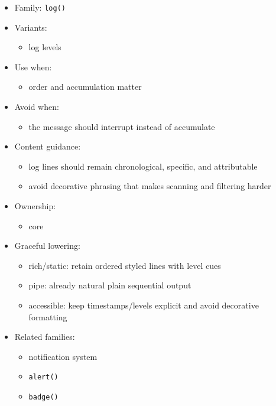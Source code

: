 \begin{itemize}
\tightlist
\item
  Family: \texttt{l\allowbreak{}o\allowbreak{}g\allowbreak{}(\allowbreak{})}
\item
  Variants:

  \begin{itemize}
  \tightlist
  \item
    log levels
  \end{itemize}
\item
  Use when:

  \begin{itemize}
  \tightlist
  \item
    order and accumulation matter
  \end{itemize}
\item
  Avoid when:

  \begin{itemize}
  \tightlist
  \item
    the message should interrupt instead of accumulate
  \end{itemize}
\item
  Content guidance:

  \begin{itemize}
  \tightlist
  \item
    log lines should remain chronological, specific, and attributable
  \item
    avoid decorative phrasing that makes scanning and filtering harder
  \end{itemize}
\item
  Ownership:

  \begin{itemize}
  \tightlist
  \item
    core
  \end{itemize}
\item
  Graceful lowering:

  \begin{itemize}
  \tightlist
  \item
    rich/static: retain ordered styled lines with level cues
  \item
    pipe: already natural plain sequential output
  \item
    accessible: keep timestamps/levels explicit and avoid decorative formatting
  \end{itemize}
\item
  Related families:

  \begin{itemize}
  \tightlist
  \item
    notification system
  \item
    \texttt{a\allowbreak{}l\allowbreak{}e\allowbreak{}r\allowbreak{}t\allowbreak{}(\allowbreak{})}
  \item
    \texttt{b\allowbreak{}a\allowbreak{}d\allowbreak{}g\allowbreak{}e\allowbreak{}(\allowbreak{})}
  \end{itemize}
\end{itemize}

